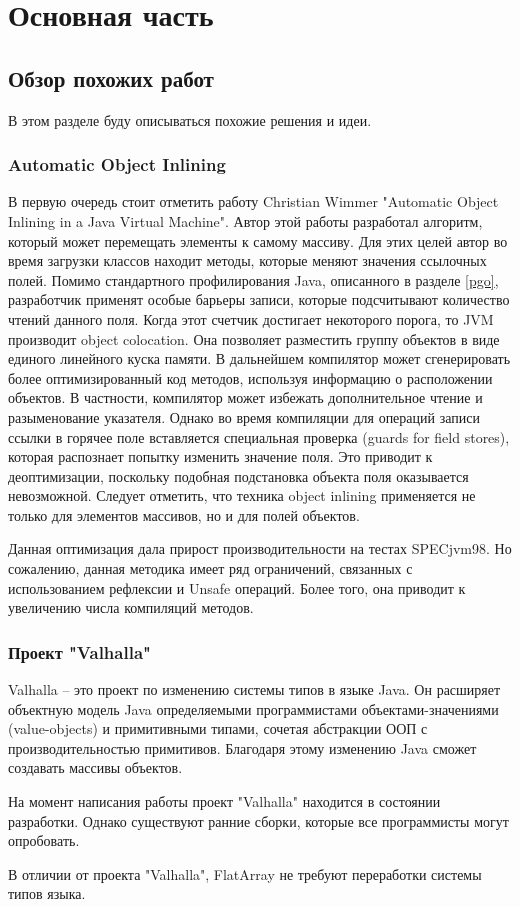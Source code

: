\section{Основная часть}
\subsection{Обзор похожих работ}
В этом разделе буду описываться похожие решения и идеи.
\subsubsection{Automatic Object Inlining} 
В первую очередь стоит отметить работу Christian Wimmer "Automatic Object Inlining in a Java Virtual Machine"\cite{wimmer-field-inlining}.
Автор этой работы разработал алгоритм, который может перемещать элементы к самому массиву.
Для этих целей автор во время загрузки классов находит методы, которые меняют значения ссылочных полей. 
Помимо стандартного профилирования Java, описанного в разделе \ref{pgo}, разработчик применят особые барьеры записи, которые подсчитывают количество чтений данного поля. Когда этот счетчик достигает некоторого порога, то JVM производит object colocation. 
Она позволяет разместить группу объектов в виде единого линейного куска памяти. 
В дальнейшем компилятор может сгенерировать более оптимизированный код методов, используя информацию о расположении объектов. В частности, компилятор может избежать дополнительное чтение и разыменование указателя. 
Однако во время компиляции для операций записи ссылки в горячее поле вставляется специальная проверка (guards for field stores), которая распознает попытку изменить значение поля. 
Это приводит к деоптимизации, поскольку подобная подстановка объекта поля оказывается невозможной. Следует отметить, что техника object inlining применяется не только для элементов массивов, но и для полей объектов.
\par
Данная оптимизация дала прирост производительности на тестах SPECjvm98\cite{spec98}. 
Но сожалению, данная методика имеет ряд ограничений, связанных с использованием рефлексии и Unsafe операций. Более того, она приводит к увеличению числа компиляций методов.
\subsubsection{Проект "Valhalla"}
Valhalla -- это проект по изменению системы типов в языке Java\cite{valhalla}. Он расширяет объектную модель Java определяемыми программистами объектами-значениями (value-objects) и примитивными типами, сочетая абстракции ООП с производительностью примитивов. Благодаря этому изменению Java сможет создавать массивы объектов\cite{valhalla-value-object}.
\par
На момент написания работы проект "Valhalla" находится в состоянии разработки. Однако существуют ранние сборки, которые все программисты могут опробовать.
\par
В отличии от проекта "Valhalla", FlatArray не требуют переработки системы типов языка.

